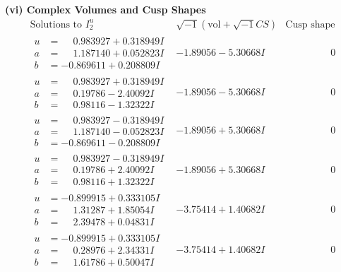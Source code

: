 \documentclass[1p]{elsarticle_modified}
\theoremstyle{definition}
\newcommand{\I}{\sqrt{-1}}
\begin{document}
\newpage\flushleft \textbf{(vi) Complex Volumes and Cusp Shapes}
$$\begin{array}{c|c|c}  
\text{Solutions to }I^u_{2}& \I (\text{vol} + \sqrt{-1}CS) & \text{Cusp shape}\\
 \hline 
\begin{aligned}
u &= \phantom{-}0.983927 + 0.318949 I \\
a &= \phantom{-}1.187140 + 0.052823 I \\
b &= -0.869611 + 0.208809 I\end{aligned}
 & -1.89056 - 5.30668 I & \phantom{-0.000000 } 0 \\ \hline\begin{aligned}
u &= \phantom{-}0.983927 + 0.318949 I \\
a &= \phantom{-}0.19786 - 2.40092 I \\
b &= \phantom{-}0.98116 - 1.32322 I\end{aligned}
 & -1.89056 - 5.30668 I & \phantom{-0.000000 } 0 \\ \hline\begin{aligned}
u &= \phantom{-}0.983927 - 0.318949 I \\
a &= \phantom{-}1.187140 - 0.052823 I \\
b &= -0.869611 - 0.208809 I\end{aligned}
 & -1.89056 + 5.30668 I & \phantom{-0.000000 } 0 \\ \hline\begin{aligned}
u &= \phantom{-}0.983927 - 0.318949 I \\
a &= \phantom{-}0.19786 + 2.40092 I \\
b &= \phantom{-}0.98116 + 1.32322 I\end{aligned}
 & -1.89056 + 5.30668 I & \phantom{-0.000000 } 0 \\ \hline\begin{aligned}
u &= -0.899915 + 0.333105 I \\
a &= \phantom{-}1.31287 + 1.85054 I \\
b &= \phantom{-}2.39478 + 0.04831 I\end{aligned}
 & -3.75414 + 1.40682 I & \phantom{-0.000000 } 0 \\ \hline\begin{aligned}
u &= -0.899915 + 0.333105 I \\
a &= \phantom{-}0.28976 + 2.34331 I \\
b &= \phantom{-}1.61786 + 0.50047 I\end{aligned}
 & -3.75414 + 1.40682 I & \phantom{-0.000000 } 0 \\ \hline\begin{aligned}

\end{aligned}
\end{array}$$
\end{document}
